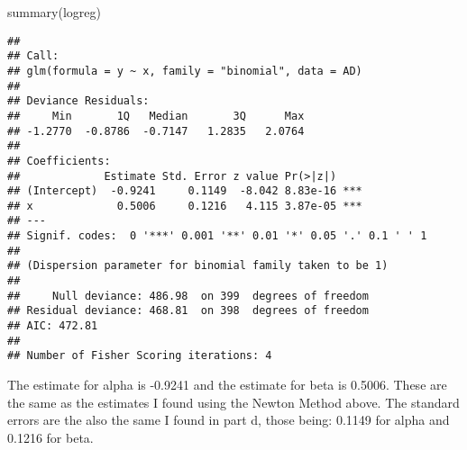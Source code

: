 \documentclass[
]{article}
\newenvironment{Shaded}{\begin{snugshade}}{\end{snugshade}}
\newcommand{\FunctionTok}[1]{\textcolor[rgb]{0.00,0.00,0.00}{#1}}
\newcommand{\NormalTok}[1]{#1}
\begin{document}
\begin{Shaded}
\begin{Highlighting}[]
\FunctionTok{summary}\NormalTok{(logreg)}
\end{Highlighting}
\end{Shaded}

\begin{verbatim}
## 
## Call:
## glm(formula = y ~ x, family = "binomial", data = AD)
## 
## Deviance Residuals: 
##     Min       1Q   Median       3Q      Max  
## -1.2770  -0.8786  -0.7147   1.2835   2.0764  
## 
## Coefficients:
##             Estimate Std. Error z value Pr(>|z|)    
## (Intercept)  -0.9241     0.1149  -8.042 8.83e-16 ***
## x             0.5006     0.1216   4.115 3.87e-05 ***
## ---
## Signif. codes:  0 '***' 0.001 '**' 0.01 '*' 0.05 '.' 0.1 ' ' 1
## 
## (Dispersion parameter for binomial family taken to be 1)
## 
##     Null deviance: 486.98  on 399  degrees of freedom
## Residual deviance: 468.81  on 398  degrees of freedom
## AIC: 472.81
## 
## Number of Fisher Scoring iterations: 4
\end{verbatim}

The estimate for alpha is -0.9241 and the estimate for beta is 0.5006.
These are the same as the estimates I found using the Newton Method
above. The standard errors are the also the same I found in part d,
those being: 0.1149 for alpha and 0.1216 for beta.
\end{document}
